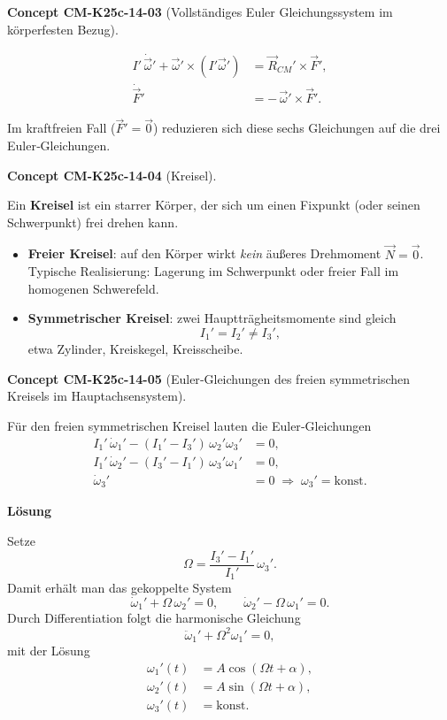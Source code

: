 \documentclass[10pt, letterpaper]{article}
\newcommand{\CustomHeading}[3]{%
  \par\medskip\noindent%
  \textbf{#1 #2} \textnormal{(#3)}.\enskip%
}
\newenvironment{CONC}[2]{\CustomHeading{Concept}{#1}{#2}}{}
\begin{document}
\begin{CONC}{CM-K25c-14-03}{Vollständiges Euler Gleichungssystem im körperfesten Bezug}
\[
\boxed{
\begin{aligned}
I'\,\dot{\vec\omega}' + \vec\omega' \times (I'\vec\omega') &= \vec R_{CM}' \times \vec F', \\[4pt]
\dot{\vec F}' &= -\,\vec\omega' \times \vec F'.
\end{aligned}}
\]

Im kraftfreien Fall ($\vec F'=\vec 0$) reduzieren sich diese sechs Gleichungen auf die drei Euler‐Gleichungen.
\end{CONC}

\begin{CONC}{CM-K25c-14-04}{Kreisel}
Ein \textbf{Kreisel} ist ein starrer Körper, der sich um einen Fixpunkt (oder seinen Schwerpunkt) frei drehen kann.  
\begin{itemize}
\item \textbf{Freier Kreisel}: auf den Körper wirkt \emph{kein} äußeres Drehmoment $\vec N = \vec 0$.  
      Typische Realisierung: Lagerung im Schwerpunkt oder freier Fall im homogenen Schwerefeld.  
\item \textbf{Symmetrischer Kreisel}: zwei Hauptträgheitsmomente sind gleich  
      \[
        I_1'=I_2'\neq I_3',
      \]
      etwa Zylinder, Kreiskegel, Kreisscheibe.
\end{itemize}
\end{CONC}

\begin{CONC}{CM-K25c-14-05}{Euler‐Gleichungen des freien symmetrischen Kreisels im Hauptachsensystem}
Für den freien symmetrischen Kreisel lauten die Euler‐Gleichungen
\[
\begin{aligned}
I_1'\,\dot\omega_1' - (I_1'-I_3')\,\omega_2'\omega_3' &= 0,\\
I_1'\,\dot\omega_2' - (I_3'-I_1')\,\omega_3'\omega_1' &= 0,\\
\dot\omega_3' &= 0\;\Longrightarrow\; \omega_3'=\text{konst}.
\end{aligned}
\]

\textbf{Lösung}

Setze
\[
\Omega=\frac{I_3'-I_1'}{I_1'}\,\omega_3'.
\]
Damit erhält man das gekoppelte System
\[
\dot\omega_1' + \Omega\,\omega_2' = 0,
\qquad
\dot\omega_2' - \Omega\,\omega_1' = 0.
\]
Durch Differentiation folgt die harmonische Gleichung
\[
\ddot\omega_1' + \Omega^2\omega_1' = 0,
\]
mit der Lösung
\[
\boxed{
\begin{aligned}
\omega_1'(t) &= A\cos(\Omega t+\alpha),\\
\omega_2'(t) &= A\sin(\Omega t+\alpha),\\
\omega_3'(t) &= \text{konst}.
\end{aligned}}
\]
\end{CONC}
\end{document}
